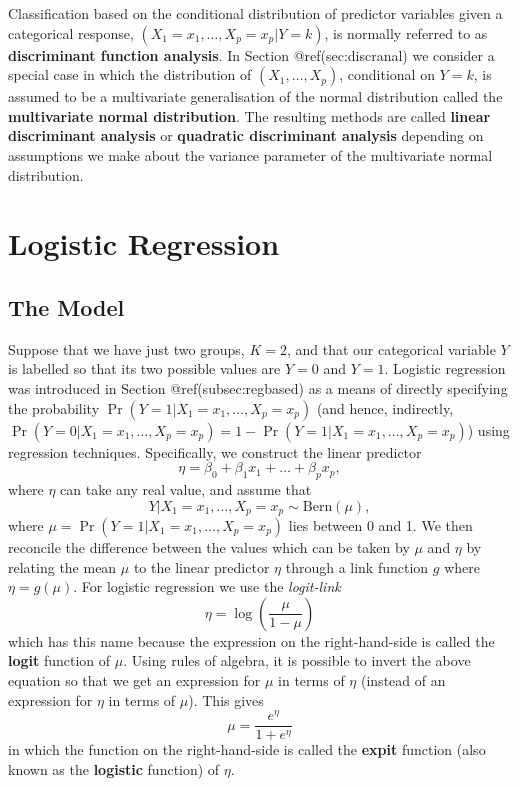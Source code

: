 \documentclass[
]{article}
\begin{document}
Classification based on the conditional distribution of predictor
variables given a categorical response,
\((X_1 = x_1, \ldots, X_p = x_p | Y = k)\), is normally referred to as
\textbf{discriminant function analysis}. In Section @ref(sec:discranal)
we consider a special case in which the distribution of
\((X_1, \ldots, X_p)\), conditional on \(Y = k\), is assumed to be a
multivariate generalisation of the normal distribution called the
\textbf{multivariate normal distribution}. The resulting methods are
called \textbf{linear discriminant analysis} or \textbf{quadratic
discriminant analysis} depending on assumptions we make about the
variance parameter of the multivariate normal distribution.

\hypertarget{sec:logisticreg}{%
\section{Logistic Regression}\label{sec:logisticreg}}

\hypertarget{the-model}{%
\subsection{The Model}\label{the-model}}

Suppose that we have just two groups, \(K=2\), and that our categorical
variable \(Y\) is labelled so that its two possible values are \(Y=0\)
and \(Y=1\). Logistic regression was introduced in Section
@ref(subsec:regbased) as a means of directly specifying the probability
\(\Pr(Y = 1 | X_1 = x_1, \ldots, X_p = x_p)\) (and hence, indirectly,
\(\Pr(Y = 0 | X_1 = x_1, \ldots, X_p = x_p) = 1 - \Pr(Y = 1 | X_1 = x_1, \ldots, X_p = x_p)\))
using regression techniques. Specifically, we construct the linear
predictor \begin{equation*}
\eta = \beta_0 + \beta_1 x_{1} + \ldots + \beta_p x_{p},
\end{equation*} where \(\eta\) can take any real value, and assume that
\begin{equation*}
Y | X_1 = x_1, \ldots, X_p = x_p \sim \mathrm{Bern}(\mu),
\end{equation*} where
\(\mu = \Pr(Y = 1 | X_1 = x_1, \ldots, X_p = x_p)\) lies between 0 and
1. We then reconcile the difference between the values which can be
taken by \(\mu\) and \(\eta\) by relating the mean \(\mu\) to the linear
predictor \(\eta\) through a link function \(g\) where
\(\eta = g(\mu)\). For logistic regression we use the \emph{logit-link}
\begin{equation*}
\eta = \log\left( \frac{\mu}{1 - \mu} \right)
\end{equation*} which has this name because the expression on the
right-hand-side is called the \textbf{logit} function of \(\mu\). Using
rules of algebra, it is possible to invert the above equation so that we
get an expression for \(\mu\) in terms of \(\eta\) (instead of an
expression for \(\eta\) in terms of \(\mu\)). This gives
\begin{equation*}
\mu = \frac{e^{\eta}}{1 + e^{\eta}}
\end{equation*} in which the function on the right-hand-side is called
the \textbf{expit} function (also known as the \textbf{logistic}
function) of \(\eta\).
\end{document}
